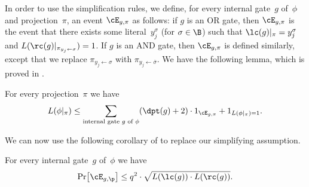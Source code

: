 In order to use the simplification rules, we define, for every internal
gate~$g$ of~$\phi$ and projection~$\pi$, an event $\cE_{g,\pi}$
as follows: if $g$ is an OR gate, then $\cE_{g,\pi}$ is the event
that there exists some literal~$y_{j}^{\sigma}$ (for $\sigma\in\B$)
such that $\lc(g)|_{\pi}=y_{j}^{\sigma}$ and $L(\rc(g)|_{\pi_{y_{j}\gets\sigma}})=1$.
If $g$ is an AND gate, then $\cE_{g,\pi}$ is defined similarly,
except that we replace $\pi_{y_{j}\gets\sigma}$ with $\pi_{y_{j}\gets\overline{\sigma}}$.
We have the following lemma, which is proved in . 
\begin{lemma}
\label{lemma:reduction-to-size-2-with-substitution}For every projection~$\pi$
we have 
\[
L(\phi|_{\pi})\le\sum_{\text{internal gate \ensuremath{g} of \ensuremath{\phi}}}(\dpt(g)+2)\cdot1_{\cE_{g,\pi}}+1_{L(\phi|_{\pi})=1}.
\]
\end{lemma}

We can now use the following corollary of 
to replace our simplifying assumption. 
\begin{corollary}
\label{cor:shrinkage-to-two-literals}For every internal gate~$g$ of~$\phi$
we have 
\[
\Pr\!\left[\cE_{g,\p}\right]\le q^{2}\cdot\sqrt{L(\lc(g))\cdot L(\rc(g))}.
\]
\end{corollary}

